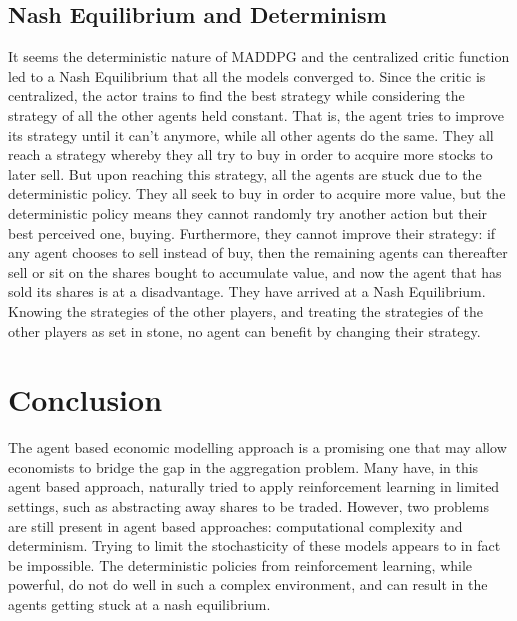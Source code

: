 \documentclass{article}
\begin{document}
\subsection{Nash Equilibrium and Determinism}
It seems the deterministic nature of MADDPG and the centralized critic function led to a Nash Equilibrium that all the models converged to. Since the critic is centralized, the actor trains to find the best strategy while considering the strategy of all the other agents held constant. That is, the agent tries to improve its strategy until it can't anymore, while all other agents do the same. They all reach a strategy whereby they all try to buy in order to acquire more stocks to later sell. But upon reaching this strategy, all the agents are stuck due to the deterministic policy. They all seek to buy in order to acquire more value, but the deterministic policy means they cannot randomly try another action but their best perceived one, buying. Furthermore, they cannot improve their strategy: if any agent chooses to sell instead of buy, then the remaining agents can thereafter sell or sit on the shares bought to accumulate value, and now the agent that has sold its shares is at a disadvantage. They have arrived at a Nash Equilibrium. Knowing the strategies of the other players, and treating the strategies of the other players as set in stone, no agent can benefit by changing their strategy.

\section{Conclusion}
The agent based economic modelling approach is a promising one that may allow economists to bridge the gap in the aggregation problem. Many have, in this agent based approach, naturally tried to apply reinforcement learning in limited settings, such as abstracting away shares to be traded. However, two problems are still present in agent based approaches: computational complexity and determinism. Trying to limit the stochasticity of these models appears to in fact be impossible. The deterministic policies from reinforcement learning, while powerful, do not do well in such a complex environment, and can result in the agents getting stuck at a nash equilibrium. 



\end{document}
